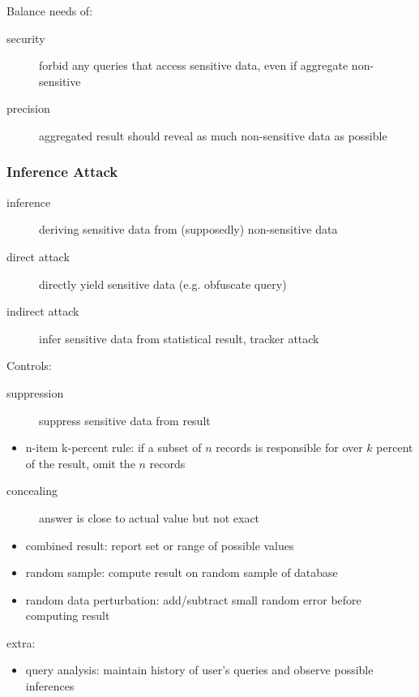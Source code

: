 \documentclass[]{article}
\theoremstyle{definition}
\begin{document}
	Balance needs of:
	\begin{description}
		\item[security] forbid any queries that access sensitive data, even if aggregate non-sensitive
		\item[precision] aggregated result should reveal as much non-sensitive data as possible
	\end{description}
	
	\subsubsection{Inference Attack}
	\begin{description}
		\item[inference] deriving sensitive data from (supposedly) non-sensitive data
		\item[direct attack] directly yield sensitive data (e.g. obfuscate query)
		\item[indirect attack] infer sensitive data from statistical result, tracker attack
	\end{description}

	Controls:
	\begin{description}
		\item[suppression] suppress sensitive data from result
	\end{description}
	\begin{itemize}
		\item n-item k-percent rule: if a subset of $n$ records is responsible for over $k$ percent of the result, omit the $n$ records
	\end{itemize}
	\begin{description}
		\item[concealing] answer is close to actual value but not exact
	\end{description}
	\begin{itemize}
		\item combined result: report set or range of possible values
		\item random sample: compute result on random sample of database
		\item random data perturbation: add/subtract small random error before computing result
	\end{itemize}

	extra:
	\begin{itemize}
		\item query analysis: maintain history of user's queries and observe possible inferences
	\end{itemize}
\end{document}
